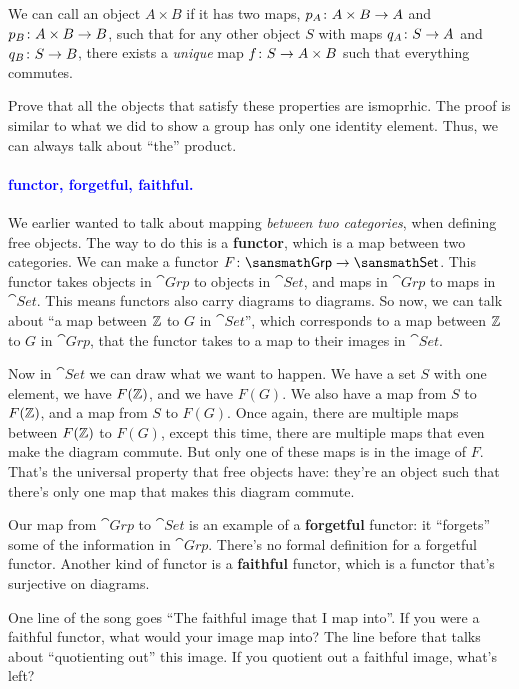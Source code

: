 \documentclass[11pt,paper=letter]{scrartcl}
\renewcommand{\bluebf}[1]{{\bfseries \color{Blue} #1}}
\renewcommand\wp[1]{\paragraph{\textcolor{Blue}{#1.}} \hspace{-1em}}
\newcommand\wl[1]{\label{w:#1}}
\begin{document}
We can call an object $A \times B$ if it has two maps, $p_A \colon A \times B \to A$ and $p_B \colon A \times B \to B$, such that for any other object $S$ with maps $q_A \colon S \to A$ and $q_B \colon S \to B$, there exists a \textit{unique} map $f \colon S \to A \times B$ such that everything commutes.

\begin{exrboxed}
  Prove that all the objects that satisfy these properties are ismoprhic. The proof is similar to what we did to show a group has only one identity element. Thus, we can always talk about ``the'' product.
\end{exrboxed}


\wp{functor, forgetful, faithful}
\wl{functor}
\wl{forgetful}
\wl{faithful}
We earlier wanted to talk about mapping \textit{between two categories}, when defining free objects. The way to do this is a \bluebf{functor}, which is a map between two categories. We can make a functor $F \from \cat{Grp} \to \cat{Set}$. This functor takes objects in $\cat{Grp}$ to objects in $\cat{Set}$, and maps in $\cat{Grp}$ to maps in $\cat{Set}$. This means functors also carry diagrams to diagrams. So now, we can talk about ``a map between $\mathbb Z$ to $G$ in $\cat{Set}$'', which corresponds to a map between $\mathbb Z$ to $G$ in $\cat{Grp}$, that the functor takes to a map to their images in $\cat{Set}$.

Now in $\cat{Set}$ we can draw what we want to happen. We have a set $S$ with one element, we have $F(\mathbb Z)$, and we have $F(G)$. We also have a map from $S$ to $F(\mathbb Z)$, and a map from $S$ to $F(G)$. Once again, there are multiple maps between $F(\mathbb Z)$ to $F(G)$, except this time, there are multiple maps that even make the diagram commute. But only one of these maps is in the image of $F$. That's the universal property that free objects have: they're an object such that there's only one map that makes this diagram commute.

Our map from $\cat{Grp}$ to $\cat{Set}$ is an example of a \bluebf{forgetful} functor: it ``forgets'' some of the information in $\cat{Grp}$. There's no formal definition for a forgetful functor. Another kind of functor is a \bluebf{faithful} functor, which is a functor that's surjective on diagrams.

\begin{exrboxed}
  One line of the song goes ``The faithful image that I map into''. If you were a faithful functor, what would your image map into? The line before that talks about ``quotienting out'' this image. If you quotient out a faithful image, what's left?
\end{exrboxed}
\end{document}
